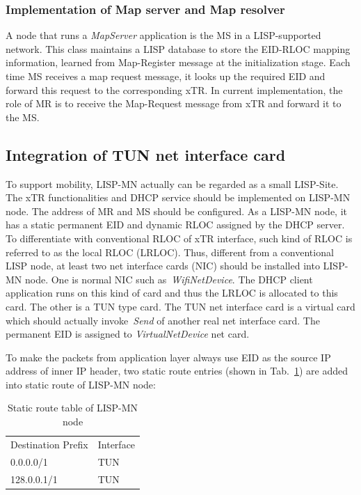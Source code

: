 \subsubsection{Implementation of Map server and Map resolver}
A node that runs a \emph{MapServer} application is the MS in a LISP-supported network. This class maintains a LISP database to store the EID-RLOC mapping information, learned from Map-Register message at the initialization stage. Each time MS receives a map request message, it looks up the required EID and forward this request to the corresponding xTR. In current implementation, the role of MR is to receive the Map-Request message from xTR and forward it to the MS.

\subsection{Integration of TUN net interface card}
\label{subsec:tundevice}
To support mobility, LISP-MN actually can be regarded as a small LISP-Site. The xTR functionalities and DHCP service should be implemented on LISP-MN node. The address of MR and MS should be configured. As a LISP-MN node, it has a static permanent EID and dynamic RLOC assigned by the DHCP server. To differentiate with conventional RLOC of xTR interface, such kind of RLOC is referred to as the local RLOC (LRLOC). Thus, different from a conventional LISP node, at least two net interface cards (NIC) should be installed into LISP-MN node. One is normal NIC such as~\emph{WifiNetDevice}. The DHCP client application runs on this kind of card and thus the LRLOC is allocated to this card. The other is a TUN type card. The TUN net interface card is a virtual card which should actually invoke~\emph{Send} of another real net interface card. The permanent EID is assigned to \emph{VirtualNetDevice} net card. 

To make the packets from application layer always use EID as the source IP address of inner IP header, two static route entries (shown in Tab.~\ref{tab:static-route-table}) are added into static route of LISP-MN node:
\begin{table}[]
	\centering
	\caption{Static route table of LISP-MN node}
	\label{tab:static-route-table}
	\begin{tabular}{ll}
		Destination Prefix & Interface \\
		0.0.0.0/1          & TUN       \\
		128.0.0.1/1        & TUN      
	\end{tabular}
\end{table}

